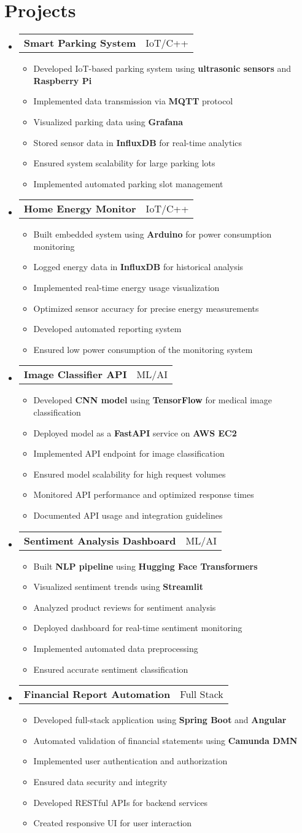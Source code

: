 \documentclass[letterpaper,11pt]{article}
\makeatletter
\newcommand{\resumeItem}[1]{
    \item\small{
            {#1 \vspace{-2pt}}
    }
}
\newcommand{\resumeProjectHeading}[2]{
    \item
    \begin{tabular*}{0.97\textwidth}{l@{\extracolsep{\fill}}r}
    \small#1 & #2 \\
    \end{tabular*}\vspace{-7pt}
}
\newcommand{\resumeSubItem}[1]{\resumeItem{#1}\vspace{-4pt}}
\newcommand{\resumeSubHeadingListStart}{\begin{itemize}[leftmargin=0.15in, label={}]}
\newcommand{\resumeSubHeadingListEnd}{\end{itemize}}
\newcommand{\resumeItemListStart}{\begin{itemize}}
\newcommand{\resumeItemListEnd}{\end{itemize}\vspace{-5pt}}
\makeatother
\begin{document}
\section{Projects}
\resumeSubHeadingListStart
\resumeProjectHeading
{\textbf{Smart Parking System}}{IoT/C++}
\resumeItemListStart
\resumeItem{Developed IoT-based parking system using \textbf{ultrasonic sensors} and \textbf{Raspberry Pi}}
\resumeItem{Implemented data transmission via \textbf{MQTT} protocol}
\resumeItem{Visualized parking data using \textbf{Grafana}}
\resumeItem{Stored sensor data in \textbf{InfluxDB} for real-time analytics}
\resumeSubItem{Ensured system scalability for large parking lots}
\resumeSubItem{Implemented automated parking slot management}
\resumeItemListEnd
\resumeProjectHeading
{\textbf{Home Energy Monitor}}{IoT/C++}
\resumeItemListStart
\resumeItem{Built embedded system using \textbf{Arduino} for power consumption monitoring}
\resumeItem{Logged energy data in \textbf{InfluxDB} for historical analysis}
\resumeItem{Implemented real-time energy usage visualization}
\resumeItem{Optimized sensor accuracy for precise energy measurements}
\resumeSubItem{Developed automated reporting system}
\resumeSubItem{Ensured low power consumption of the monitoring system}
\resumeItemListEnd
\resumeProjectHeading
{\textbf{Image Classifier API}}{ML/AI}
\resumeItemListStart
\resumeItem{Developed \textbf{CNN model} using \textbf{TensorFlow} for medical image classification}
\resumeItem{Deployed model as a \textbf{FastAPI} service on \textbf{AWS EC2}}
\resumeItem{Implemented API endpoint for image classification}
\resumeItem{Ensured model scalability for high request volumes}
\resumeSubItem{Monitored API performance and optimized response times}
\resumeSubItem{Documented API usage and integration guidelines}
\resumeItemListEnd
\resumeProjectHeading
{\textbf{Sentiment Analysis Dashboard}}{ML/AI}
\resumeItemListStart
\resumeItem{Built \textbf{NLP pipeline} using \textbf{Hugging Face Transformers}}
\resumeItem{Visualized sentiment trends using \textbf{Streamlit}}
\resumeItem{Analyzed product reviews for sentiment analysis}
\resumeItem{Deployed dashboard for real-time sentiment monitoring}
\resumeSubItem{Implemented automated data preprocessing}
\resumeSubItem{Ensured accurate sentiment classification}
\resumeItemListEnd
\resumeProjectHeading
{\textbf{Financial Report Automation}}{Full Stack}
\resumeItemListStart
\resumeItem{Developed full-stack application using \textbf{Spring Boot} and \textbf{Angular}}
\resumeItem{Automated validation of financial statements using \textbf{Camunda DMN}}
\resumeItem{Implemented user authentication and authorization}
\resumeItem{Ensured data security and integrity}
\resumeSubItem{Developed RESTful APIs for backend services}
\resumeSubItem{Created responsive UI for user interaction}
\resumeItemListEnd
\resumeSubHeadingListEnd
\end{document}
